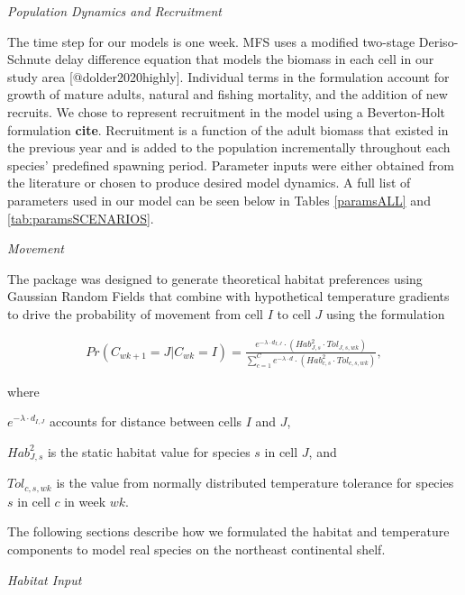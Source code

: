 \documentclass[
]{article}
\begin{document}
\emph{Population Dynamics and Recruitment}

The time step for our models is one week. MFS uses a modified two-stage Deriso-Schnute delay difference equation that models the biomass in each cell in our study area {[}@dolder2020highly{]}. Individual terms in the formulation account for growth of mature adults, natural and fishing mortality, and the addition of new recruits. We chose to represent recruitment in the model using a Beverton-Holt formulation \textbf{cite}. Recruitment is a function of the adult biomass that existed in the previous year and is added to the population incrementally throughout each species' predefined spawning period. Parameter inputs were either obtained from the literature or chosen to produce desired model dynamics. A full list of parameters used in our model can be seen below in Tables \ref{paramsALL} and \ref{tab:paramsSCENARIOS}.

\emph{Movement}

The package was designed to generate theoretical habitat preferences using Gaussian Random Fields that combine with hypothetical temperature gradients to drive the probability of movement from cell \(I\) to cell \(J\) using the formulation

\begin{align}
Pr(C_{wk+1}=J|C_{wk}=I) = \frac{e^{-\lambda \cdot d_{I,J}}\cdot(Hab^2_{J,s} \cdot Tol_{J,s,wk})}{\sum^C_{c=1}e^{-\lambda \cdot d} \cdot (Hab^2_{c,s} \cdot Tol_{c,s,wk})},
\label{moveP}
\end{align}

where

\(e^{-\lambda \cdot d_{I,J}}\) accounts for distance between cells \(I\) and \(J\),

\(Hab^2_{J,s}\) is the static habitat value for species \(s\) in cell \(J\), and

\(Tol_{c,s,wk}\) is the value from normally distributed temperature tolerance for species \(s\) in cell \(c\) in week \(wk\).

The following sections describe how we formulated the habitat and temperature components to model real species on the northeast continental shelf.

\emph{Habitat Input}
\end{document}
